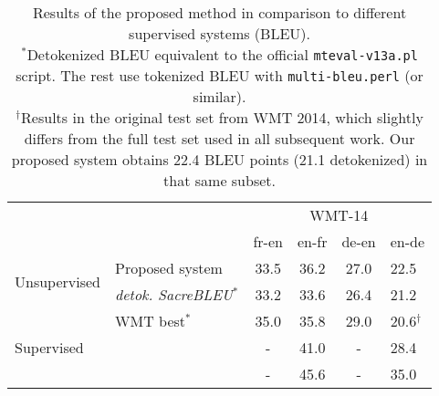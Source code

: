 \documentclass[11pt,a4paper]{article}
\begin{document}
\begin{table*}[t]
\begin{center}
\begin{small}
  \begin{tabular}{llcccl}
    \toprule
    & & \multicolumn{4}{c}{WMT-14} \\
    \cmidrule{3-6}
    & & fr-en & en-fr & de-en & en-de \\
    \midrule
    \multirow{2}{*}{Unsupervised}
    & Proposed system & 33.5 & 36.2 & 27.0 & 22.5 \\
    & \quad \textit{detok. SacreBLEU}$^*$ & 33.2 & 33.6 & 26.4 & 21.2 \\
    \midrule
    \multirow{3}{*}{Supervised}
    & WMT best$^*$ & 35.0 & 35.8 & 29.0 & 20.6$^\dagger$ \\
    & \citet{vaswani2017attention} & - & 41.0 & - & 28.4 \\
    & \citet{edunov2018understanding} & - & 45.6 & - & 35.0 \\
    \bottomrule
  \end{tabular}
\end{small}
\end{center}
\caption{Results of the proposed method in comparison to different supervised systems (BLEU). \\
$^*$Detokenized BLEU equivalent to the official \texttt{mteval-v13a.pl} script. The rest use tokenized BLEU with \texttt{multi-bleu.perl} (or similar). \\
$^\dagger$Results in the original test set from WMT 2014, which slightly differs from the full test set used in all subsequent work. Our proposed system obtains 22.4 BLEU points (21.1 detokenized) in that same subset.}
\label{tab:results_supervised}
\end{table*}
\end{document}
